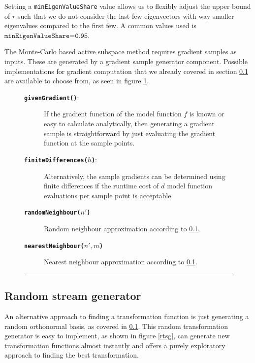 \documentclass[
  a4paper,  %
  twoside,  %
  bibliography=totoc,
  headsepline,
  cleardoublepage=empty,
  parskip=half,
  draft=false
]{scrbook}
\newcommand{\delimit}{{\color{charcoal}\noindent\rule{\textwidth}{1pt}}}
\begin{document}
Setting a \texttt{minEigenValueShare} value allows us to flexibly adjust the upper bound of $r$ such that we do not consider the last few eigenvectors with way smaller eigenvalues compared to the first few.
A common values used is $\texttt{minEigenValueShare=0.95}$.

The Monte-Carlo based active subspace method requires gradient samples as inputs.
These are generated by a gradient sample generator component.
Possible implementations for gradient computation that we already covered in section \ref{} are available to choose from, as seen in figure \ref{fig:gg}.


\newpage

\begin{mdframed}[style=style,frametitle={Gradient sample generator}]
\begin{figure}[H]
\begin{description}
\item[\texttt{\textbf{givenGradient()}}:] If the gradient function of the model function $f$ is known or easy to calculate analytically, then generating a gradient sample is straightforward by just evaluating the gradient function at the sample points.
\item[\texttt{\textbf{finiteDifferences($h$)}}:] Alternatively, the sample gradients can be determined using finite differences if the runtime cost of $d$ model function evaluations per sample point is acceptable.
\item[\texttt{\textbf{randomNeighbour($n'$)}}] Random neighbour approximation according to \ref{}.
\item[\texttt{\textbf{nearestNeighbour($n', m$)}}] Nearest neighbour approximation according to \ref{}.
\end{description}
\delimit
{}
\label{fig:gg}
\end{figure}
\end{mdframed}

\subsection {Random stream generator}

An alternative approach to finding a transformation function is just generating a random orthonormal basis, as covered in \ref{}.
This random transformation generator is easy to implement, as shown in figure \ref{rtsg}, can generate new transformation functions almost instantly and offers a purely exploratory approach to finding the best transformation.
\end{document}
